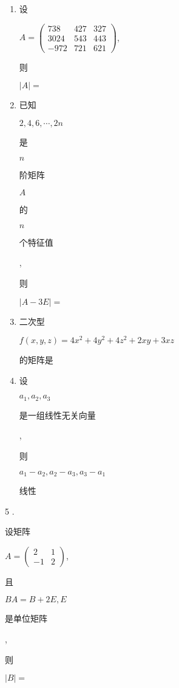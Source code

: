 \documentclass[10pt]{article}
\begin{document}
\begin{enumerate}
  \item \begin{CJK}{UTF8}{mj}设\end{CJK} $A=\left(\begin{array}{ccc}738 & 427 & 327 \\ 3024 & 543 & 443 \\ -972 & 721 & 621\end{array}\right)$, \begin{CJK}{UTF8}{mj}则\end{CJK} $|A|=$

  \item \begin{CJK}{UTF8}{mj}已知\end{CJK} $2,4,6, \cdots, 2 n$ \begin{CJK}{UTF8}{mj}是\end{CJK} $n$ \begin{CJK}{UTF8}{mj}阶矩阵\end{CJK} $A$ \begin{CJK}{UTF8}{mj}的\end{CJK} $n$ \begin{CJK}{UTF8}{mj}个特征值\end{CJK}, \begin{CJK}{UTF8}{mj}则\end{CJK} $|A-3 E|=$

  \item \begin{CJK}{UTF8}{mj}二次型\end{CJK} $f(x, y, z)=4 x^{2}+4 y^{2}+4 z^{2}+2 x y+3 x z$ \begin{CJK}{UTF8}{mj}的矩阵是\end{CJK}

  \item \begin{CJK}{UTF8}{mj}设\end{CJK} $a_{1}, a_{2}, a_{3}$ \begin{CJK}{UTF8}{mj}是一组线性无关向量\end{CJK}, \begin{CJK}{UTF8}{mj}则\end{CJK} $a_{1}-a_{2}, a_{2}-a_{3}, a_{3}-a_{1}$ \begin{CJK}{UTF8}{mj}线性\end{CJK}

\end{enumerate}
5 . \begin{CJK}{UTF8}{mj}设矩阵\end{CJK} $A=\left(\begin{array}{cc}2 & 1 \\ -1 & 2\end{array}\right)$, \begin{CJK}{UTF8}{mj}且\end{CJK} $B A=B+2 E, E$ \begin{CJK}{UTF8}{mj}是单位矩阵\end{CJK}, \begin{CJK}{UTF8}{mj}则\end{CJK} $|B|=$
\end{document}
